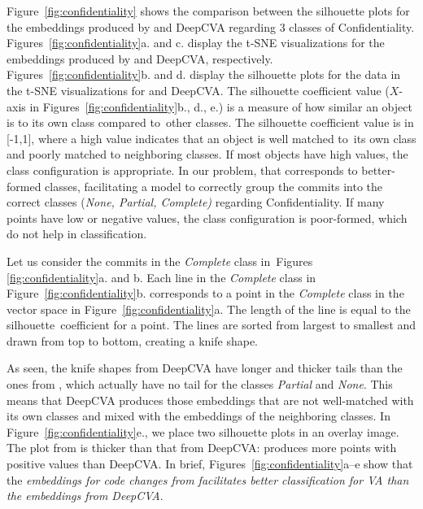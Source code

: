 Figure~\ref{fig:confidentiality} shows the comparison between the
silhouette plots for the embeddings produced by {\tool} and DeepCVA
regarding 3 classes of
Confidentiality. Figures~\ref{fig:confidentiality}a. and c. display
the t-SNE visualizations for the embeddings produced by {\tool} and
DeepCVA, respectively. Figures~\ref{fig:confidentiality}b. and
d. display the silhouette plots for the data in the
t-SNE visualizations for {\tool} and DeepCVA.
The silhouette coefficient value ($X$-axis in
Figures~\ref{fig:confidentiality}b., d., e.) is a measure of how
similar an object is to its own class compared to~other classes. The
silhouette coefficient value is in [-1,1], where a high value
indicates that an object is well matched to~its own class and poorly
matched to neighboring classes. If most objects have high values, the
class configuration is appropriate. In our problem, that corresponds
to better-formed classes, facilitating a model to correctly group the
commits into the correct classes ({\em None, Partial, Complete)}
regarding Confidentiality. If many points have low or negative values,
the class configuration is poor-formed, which do not help in
classification.

Let us consider the commits in the {\em Complete} class
in~Figures \ref{fig:confidentiality}a. and b. Each line in the {\em
Complete} class in Figure~\ref{fig:confidentiality}b. corresponds to a
point in the {\em Complete} class in the vector space in
Figure~\ref{fig:confidentiality}a. The length of the line is equal to
the silhouette~coefficient for a point. The lines are
sorted from largest to smallest and drawn from top to bottom, creating
a knife shape.

As seen, the knife shapes from DeepCVA have longer and thicker
tails than the ones from {\tool}, which actually have no tail for the
classes {\em Partial} and {\em None}. This means that DeepCVA produces
those embeddings that are not well-matched with its own classes and
mixed with the embeddings of the neighboring classes. In
Figure~\ref{fig:confidentiality}e., we place two silhouette plots in
an overlay image. The plot from {\tool} is thicker than that from
DeepCVA: {\tool} produces more points with positive values than
DeepCVA. In brief, Figures~\ref{fig:confidentiality}a--e show that the
{\em embeddings for code changes from {\tool} facilitates better
classification for VA than the embeddings from DeepCVA}.


